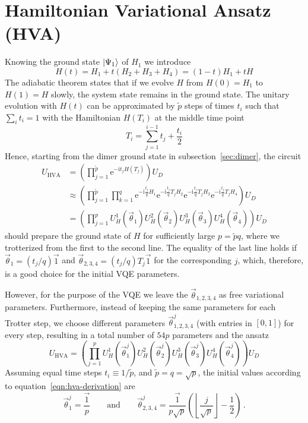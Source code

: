 \documentclass[a4paper,12pt]{article}
\newcommand{\nnl}{\nonumber\\}
\newcommand{\rme}{\mathrm{e}}
\newcommand{\rmi}{\mathrm{i}}
\begin{document}
\section{Hamiltonian Variational Ansatz (HVA)}\label{sec:hva}
Knowing the ground state $\left\vert{\Psi_1}\right\rangle$ of $H_1$ we introduce
\begin{equation}
 H(t) = H_1 + t (H_2 + H_3 + H_4)
= (1-t) H_1 + t H
\end{equation}
The adiabatic theorem states that if we evolve $H$ from $H(0) = H_1$ to $H(1) = H$ slowly, the system state remains in the ground state. The unitary evolution with $H(t)$ can be approximated by $\tilde{p}$ steps of times $t_i$ such that $\sum_i t_i = 1$ with the Hamiltonian $H(T_i)$ at the middle time point
\begin{equation}
 T_i = \sum_{j=1}^{i-1} t_j + \frac{t_i}{2}
\end{equation}
Hence, starting from the dimer ground state in subsection~\ref{sec:dimer}, the circuit
\begin{align}\label{eqn:hva-derivation}
 U_\text{HVA} &= \left(\prod_{j=1}^{\tilde{p}} 
\rme^{-\rmi t_j H(T_j)}
\right) U_D \nnl
&\approx \left(\prod_{j=1}^{\tilde{p}} \prod_{k=1}^q 
\rme^{-\rmi \frac{t_j}{q} H_1}
\rme^{-\rmi \frac{t_j}{q} T_j H_2}
\rme^{-\rmi \frac{t_j}{q} T_j H_3}
\rme^{-\rmi \frac{t_j}{q} T_j H_4}
\right) U_D \nnl
&= \left(\prod_{j=1}^{p}
U_H^1(\vec \theta_1)
U_H^2(\vec \theta_2)
U_H^3(\vec \theta_3)
U_H^4(\vec \theta_4)
\right) U_D
\end{align}
should prepare the ground state of $H$ for sufficiently large $p = \tilde{p}q$, where we trotterized from the first to the second line. The equality of the last line holds if $\vec \theta_1 = (t_j/q) \vec{1}$ and $\vec \theta_{2,3,4} = (t_j/q) T_j \vec{1}$ for the corresponding $j$, which, therefore, is a good choice for the initial VQE parameters.

However, for the purpose of the VQE we leave the $\vec\theta_{1,2,3,4}$ as free variational parameters. Furthermore, instead of keeping the same parameters for each Trotter step, we choose different parameters $\vec\theta_{1,2,3,4}^j$ (with entries in $[0,1]$) for every step, resulting in a total number of $54 p$ parameters and the ansatz
\begin{equation}\label{eqn:hva-dimer}
 U_\text{HVA}
= \left(\prod_{j=1}^{p}
U_H^1(\vec \theta_1^j)
U_H^2(\vec \theta_2^j)
U_H^3(\vec \theta_3^j)
U_H^4(\vec \theta_4^j)
\right) U_D
\end{equation}
Assuming equal time steps $t_i \equiv 1/\tilde{p}$, and $\tilde{p}=q=\sqrt{p}$, the initial values according to equation~\eqref{eqn:hva-derivation} are
\begin{equation}
\vec\theta_1^j = \frac{\vec{1}}{p} \qquad\text{and}\qquad
\vec\theta_{2,3,4}^j = \frac{\vec{1}}{p\sqrt{p}} \left(\left\lfloor\frac{j}{\sqrt{p}}\right\rfloor - \frac{1}{2}\right) \,.
\end{equation}
\end{document}
